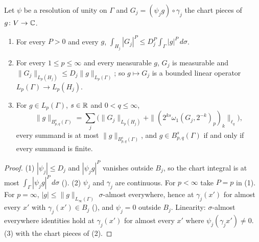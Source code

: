 \begin{lemma}
\label{lem:boundary-chart-pieces-lp}
\leanok
{}
Let $\psi$ be a resolution of unity on $\Gamma$ and $G_j = (\psi_j g) \circ \gamma_j$ the chart
pieces of $g \colon V \to \mathbb{C}$.
\begin{enumerate}
  \item For every $P > 0$ and every $g$,
    $\int_{H_j} |G_j|^P \leq D_j^P \int_\Gamma |g|^P \, d\sigma$.
  \item For every $1 \leq p \leq \infty$ and every measurable $g$, $G_j$ is measurable and
    $\|G_j\|_{L_p(H_j)} \leq D_j \|g\|_{L_p(\Gamma)}$; so $g \mapsto G_j$ is a bounded linear
    operator $L_p(\Gamma) \to L_p(H_j)$.
  \item For $g \in L_p(\Gamma)$, $s \in \mathbb{R}$ and $0 < q \leq \infty$,
    \[
      \|g\|_{B^s_{p,q}(\Gamma)} = \sum_j \bigl(\|G_j\|_{L_p(H_j)}
        + \|(2^{ks} \omega_1(G_j, 2^{-k})_p)_k\|_{\ell_q}\bigr) ,
    \]
    every summand is at most $\|g\|_{B^s_{p,q}(\Gamma)}$, and $g \in B^s_{p,q}(\Gamma)$ if and
    only if every summand is finite.
\end{enumerate}
\end{lemma}

\begin{proof}
\leanok
(1) $|\psi_j| \leq D_j$ and $|\psi_j g|^P$ vanishes outside $B_j$, so the chart integral is at
most $\int_\Gamma |\psi_j g|^P \, d\sigma$ ().
(2) $\psi_j$ and $\gamma_j$ are continuous. For $p < \infty$ take $P = p$ in (1). For $p = \infty$,
$|g| \leq \|g\|_{L_\infty(\Gamma)}$ $\sigma$-almost everywhere, hence at $\gamma_j(x')$ for
almost every $x'$ with $\gamma_j(x') \in B_j$ (), and
$\psi_j = 0$ outside $B_j$. Linearity: $\sigma$-almost everywhere identities hold at
$\gamma_j(x')$ for almost every $x'$ where $\psi_j(\gamma_j x') \neq 0$. (3)
 with the chart pieces of (2).
\end{proof}


